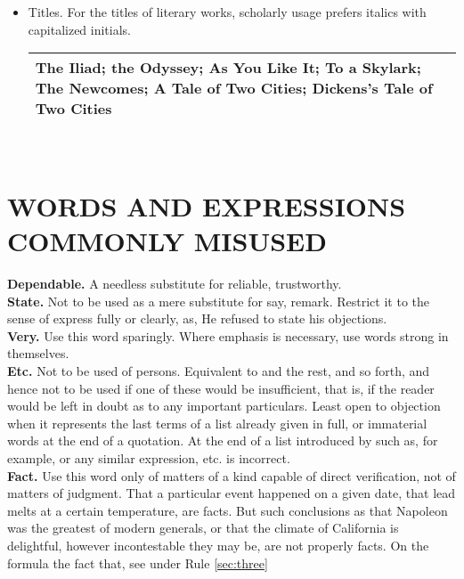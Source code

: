 \documentclass[10pt]{report}
\begin{document}
\begin{itemize}
\item 
Titles. For the titles of literary works, scholarly usage prefers italics with capitalized
initials. 

\begin{table}[!tbh]
    \centering
        \begin{tabular}{|m{18em}|m{18em}|}
        \hline
        The Iliad; the Odyssey; As You Like It; To a Skylark;
The Newcomes; A Tale of Two Cities; Dickens’s Tale of
Two Cities\\
\hline
 \end{tabular}
 \end{table}




\end{itemize}

\newpage



~

\newpage



\chapter{WORDS AND EXPRESSIONS
COMMONLY MISUSED}


{\bfseries Dependable.} A needless substitute for reliable, trustworthy.\\


\noindent
{\bfseries State.} Not to be used as a mere substitute for say, remark. Restrict it to the
sense of express fully or clearly, as, He refused to state his objections.\\

\noindent
{\bfseries Very.} Use this word sparingly. Where emphasis is necessary, use words strong
in themselves.\\



\noindent
{\bfseries Etc.} Not to be used of persons. Equivalent to and the rest, and so forth, and hence
not to be used if one of these would be insufficient, that is, if the reader would
be left in doubt as to any important particulars. Least open to objection when it
represents the last terms of a list already given in full, or immaterial words at the
end of a quotation.
At the end of a list introduced by such as, for example, or any similar expression,
etc. is incorrect.\\

\noindent
{\bfseries Fact.} Use this word only of matters of a kind capable of direct verification, not of
matters of judgment. That a particular event happened on a given date, that lead
melts at a certain temperature, are facts. But such conclusions as that Napoleon
was the greatest of modern generals, or that the climate of California is delightful,
however incontestable they may be, are not properly facts.
On the formula the fact that, see under Rule \ref{sec:three}\\
\end{document}
